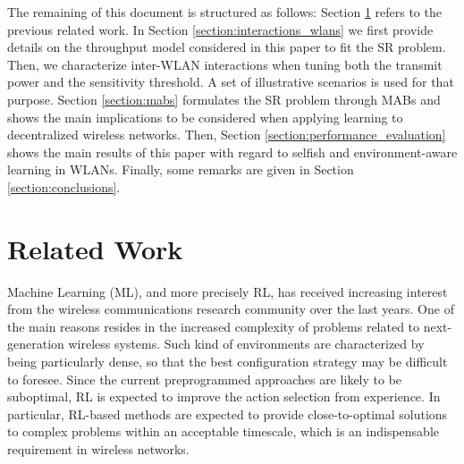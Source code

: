 \documentclass{article}
\begin{document}
The remaining of this document is structured as follows: Section \ref{section:previous_work} refers to the previous related work. In Section \ref{section:interactions_wlans} we first provide details on the throughput model considered in this paper to fit the SR problem. Then, we characterize inter-WLAN interactions when tuning both the transmit power and the sensitivity threshold. A set of illustrative scenarios is used for that purpose. Section \ref{section:mabs} formulates the SR problem through MABs and shows the main implications to be considered when applying learning to decentralized wireless networks. Then, Section \ref{section:performance_evaluation} shows the main results of this paper with regard to selfish and environment-aware learning in WLANs. Finally, some remarks are given in Section \ref{section:conclusions}.

\section{Related Work}
\label{section:previous_work} 		
Machine Learning (ML), and more precisely RL, has received increasing interest from the wireless communications research community over the last years. One of the main reasons resides in the increased complexity of problems related to next-generation wireless systems. Such kind of environments are characterized by being particularly dense, so that the best configuration strategy may be difficult to foresee. Since the current preprogrammed approaches are likely to be suboptimal, RL is expected to improve the action selection from experience. In particular, RL-based methods are expected to provide close-to-optimal solutions to complex problems within an acceptable timescale, which is an indispensable requirement in wireless networks.
\end{document}
